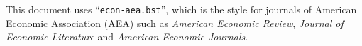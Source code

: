 \documentclass[10pt]{article}
\begin{document}
This document uses ``\verb|econ-aea.bst|'', which is the style for journals of
American Economic Association (AEA) such as {\itshape American Economic Review},
{\itshape Journal of Economic Literature} and {\itshape American Economic
Journals}.

\vspace{1em}


\nocite{*}



\end{document}
